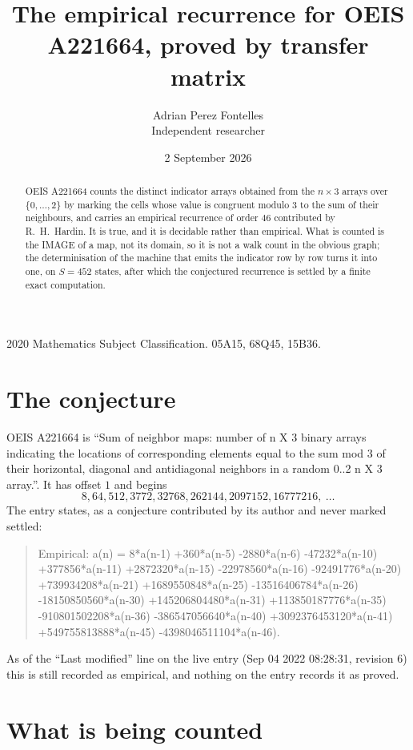 \documentclass[11pt,a4paper]{article}
\title{The empirical recurrence for OEIS A221664, proved by transfer matrix}
\author{Adrian Perez Fontelles\\ \small Independent researcher}
\date{2 September 2026}
\theoremstyle{plain}
\theoremstyle{definition}
\begin{document}
\maketitle

\begin{abstract}
OEIS A221664 counts the distinct indicator arrays obtained from the $n\times3$ arrays over
$\{0,\dots,2\}$ by marking the cells whose value is congruent modulo 3 to the sum of their neighbours, and carries an
empirical recurrence of order $46$ contributed by R.~H.~Hardin. It is true, and it is
decidable rather than empirical. What is counted is the IMAGE of a map, not its domain, so it
is not a walk count in the obvious graph; the determinisation of the machine that emits the
indicator row by row turns it into one, on $S=452$ states, after which the conjectured
recurrence is settled by a finite exact computation.
\end{abstract}

\noindent\small 2020 Mathematics Subject Classification. 05A15, 68Q45, 15B36.\normalsize

\section{The conjecture}

OEIS A221664 is ``Sum of neighbor maps: number of n X 3 binary arrays indicating the locations of corresponding elements equal to the sum mod 3 of their horizontal, diagonal and antidiagonal neighbors in a random 0..2 n X 3 array.''. It has offset $1$ and begins
\[
8, 64, 512, 3772, 32768, 262144, 2097152, 16777216,\ \dots
\]
The entry states, as a conjecture contributed by its author and never marked settled:
\begin{quote}
Empirical: a(n) = 8*a(n-1) +360*a(n-5) -2880*a(n-6) -47232*a(n-10) +377856*a(n-11) +2872320*a(n-15) -22978560*a(n-16) -92491776*a(n-20) +739934208*a(n-21) +1689550848*a(n-25) -13516406784*a(n-26) -18150850560*a(n-30) +145206804480*a(n-31) +113850187776*a(n-35) -910801502208*a(n-36) -386547056640*a(n-40) +3092376453120*a(n-41) +549755813888*a(n-45) -4398046511104*a(n-46).
\end{quote}
As of the ``Last modified'' line on the live entry (Sep 04 2022 08:28:31, revision 6) this is still
recorded as empirical, and nothing on the entry records it as proved.

\section{What is being counted}
\end{document}
